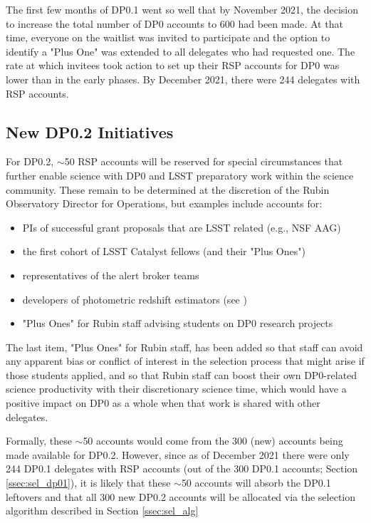 \documentclass[DM,lsstdraft,authoryear,toc]{lsstdoc}
\begin{document}
The first few months of DP0.1 went so well that by November 2021, the decision to increase the total number of DP0 accounts to 600 had been made.
At that time, everyone on the waitlist was invited to participate and the option to identify a "Plus One" was extended to all delegates who had requested one.
The rate at which invitees took action to set up their RSP accounts for DP0 was lower than in the early phases.
By December 2021, there were 244 delegates with RSP accounts.


\subsection{New DP0.2 Initiatives}\label{ssec:sel_dp02}

For DP0.2, $\sim$50 RSP accounts will be reserved for special circumstances that further enable science with DP0 and LSST preparatory work within the science community.
These remain to be determined at the discretion of the Rubin Observatory Director for Operations, but examples include accounts for:
\begin{itemize}
\item PIs of successful grant proposals that are LSST related (e.g., NSF AAG)
\item the first cohort of LSST Catalyst fellows (and their "Plus Ones")
\item representatives of the alert broker teams
\item developers of photometric redshift estimators (see )
\item "Plus Ones" for Rubin staff advising students on DP0 research projects
\end{itemize}

The last item, "Plus Ones" for Rubin staff, has been added so that staff can avoid any apparent bias or conflict of interest in the selection process that might arise if those students applied, and so that Rubin staff can boost their own DP0-related science productivity with their discretionary science time, which would have a positive impact on DP0 as a whole when that work is shared with other delegates.

Formally, these $\sim$50 accounts would come from the 300 (new) accounts being made available for DP0.2.
However, since as of December 2021 there were only 244 DP0.1 delegates with RSP accounts (out of the 300 DP0.1 accounts; Section \ref{ssec:sel_dp01}), it is likely that these $\sim$50 accounts will absorb the DP0.1 leftovers and that all 300 new DP0.2 accounts will be allocated via the selection algorithm described in Section \ref{ssec:sel_alg}
\end{document}
